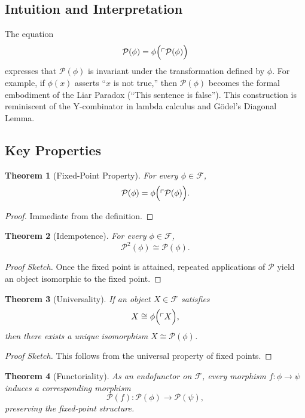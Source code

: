\documentclass[12pt]{amsart}
\theoremstyle{plain}
\newtheorem{theorem}{Theorem}[section]
\theoremstyle{definition}
\theoremstyle{remark}
\begin{document}
\subsection{Intuition and Interpretation}
The equation
\[
\mathcal{P}(\phi) = \phi\Bigl(\ulcorner \mathcal{P}(\phi) \Bigr)
\]
expresses that $\mathcal{P}(\phi)$ is invariant under the transformation defined by $\phi$. For example, if $\phi(x)$ asserts ``$x$ is not true,'' then $\mathcal{P}(\phi)$ becomes the formal embodiment of the Liar Paradox (``This sentence is false''). This construction is reminiscent of the Y-combinator in lambda calculus and Gödel’s Diagonal Lemma.

\subsection{Key Properties}
\begin{theorem}[Fixed-Point Property]
For every $\phi\in \mathcal{F}$,
\[
\mathcal{P}(\phi) = \phi\Bigl(\ulcorner \mathcal{P}(\phi) \Bigr).
\]
\end{theorem}
\begin{proof}
Immediate from the definition.
\end{proof}

\begin{theorem}[Idempotence]
For every $\phi\in \mathcal{F}$,
\[
\mathcal{P}^2(\phi) \cong \mathcal{P}(\phi).
\]
\end{theorem}
\begin{proof}[Proof Sketch]
Once the fixed point is attained, repeated applications of $\mathcal{P}$ yield an object isomorphic to the fixed point.
\end{proof}

\begin{theorem}[Universality]
If an object $X\in \mathcal{F}$ satisfies
\[
X \cong \phi\Bigl(\ulcorner X \Bigr),
\]
then there exists a unique isomorphism $X \cong \mathcal{P}(\phi)$.
\end{theorem}
\begin{proof}[Proof Sketch]
This follows from the universal property of fixed points.
\end{proof}

\begin{theorem}[Functoriality]
As an endofunctor on $\mathcal{F}$, every morphism $f: \phi \to \psi$ induces a corresponding morphism
\[
\mathcal{P}(f): \mathcal{P}(\phi) \to \mathcal{P}(\psi),
\]
preserving the fixed-point structure.
\end{theorem}
\end{document}
